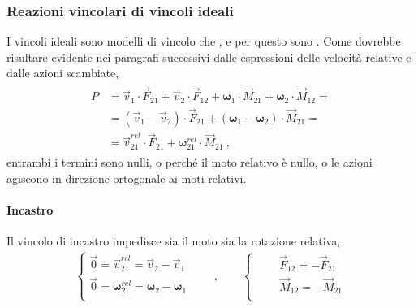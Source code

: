 \documentclass[letterpaper,10pt,italian]{jupyterBook}
\begin{document}
\subsubsection{Reazioni vincolari di vincoli ideali}
\label{\detokenize{ch/mechanics/actions-examples:reazioni-vincolari-di-vincoli-ideali}}
\sphinxAtStartPar
I vincoli ideali sono modelli di vincolo che , e per questo sono . Come dovrebbe risultare evidente nei paragrafi successivi dalle espressioni delle velocità relative e dalle azioni scambiate,
\begin{equation*}
\begin{split}\begin{aligned}
P & = \vec{v}_1     \cdot \vec{F}_{21} + \vec{v}_2     \cdot \vec{F}_{12} 
    + \symbf{\omega}_1 \cdot \vec{M}_{21} + \symbf{\omega}_2 \cdot \vec{M}_{12} = \\ 
  & = ( \vec{v}_1 - \vec{v}_2 ) \cdot \vec{F}_{21}
    + ( \symbf{\omega}_1 - \symbf{\omega}_2 ) \cdot \vec{M}_{21} = \\ 
  & = \vec{v}^{rel}_{21} \cdot \vec{F}_{21}
    + \symbf{\omega}^{rel}_{21} \cdot \vec{M}_{21} \ ,
\end{aligned}\end{split}
\end{equation*}
\sphinxAtStartPar
entrambi i termini sono nulli, o perché il moto relativo è nullo, o le azioni agiscono in direzione ortogonale ai moti relativi.


\paragraph{Incastro}
\label{\detokenize{ch/mechanics/actions-examples:incastro}}
\sphinxAtStartPar
Il vincolo di incastro impedisce sia il moto sia la rotazione relativa,
\begin{equation*}
\begin{split}
\begin{cases}
  \vec{0} = \vec{v}^{rel}_{21}     = \vec{v}_{2}     - \vec{v}_{1} \\
  \vec{0} = \symbf{\omega}^{rel}_{21} = \symbf{\omega}_{2} - \symbf{\omega}_{1} \\
\end{cases}
\qquad , \qquad
\begin{cases}
  \qquad \vec{F}_{12} = - \vec{F}_{21} \\
  \qquad \vec{M}_{12} = - \vec{M}_{21} \\
\end{cases}
\end{split}
\end{equation*}
\end{document}
